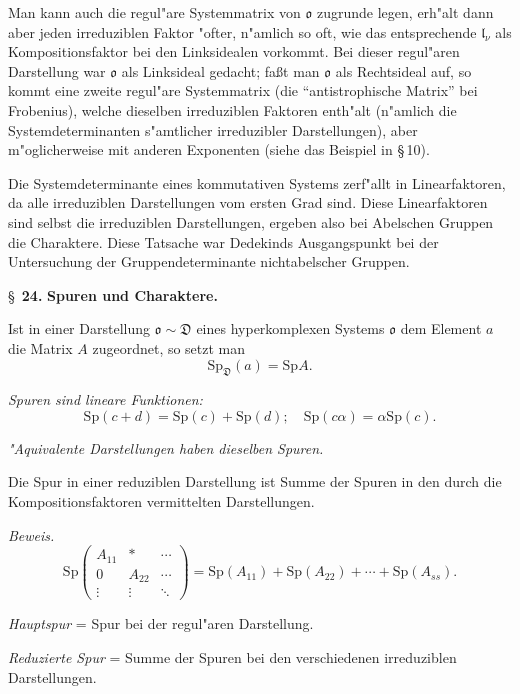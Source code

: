 \documentclass[12pt,a4paper]{article}
\theoremstyle{plain}
\newcommand{\Sp}{\mathrm{Sp}}
\begin{document}
Man kann auch die regul"are Systemmatrix von $\mathfrak{o}$ zugrunde legen, erh"alt dann aber jeden irreduziblen Faktor "ofter, n"amlich so oft, wie das entsprechende $\mathfrak{l}_\nu$ als Kompositionsfaktor bei den Linksidealen vorkommt. Bei dieser regul"aren Darstellung war $\mathfrak{o}$ als Linksideal gedacht; fa\ss t man $\mathfrak{o}$ als Rechtsideal auf, so kommt eine zweite regul"are Systemmatrix (die ``antistrophische Matrix'' bei Frobenius), welche dieselben irreduziblen Faktoren enth"alt (n"amlich die Systemdeterminanten s"amtlicher irreduzibler Darstellungen), aber m"oglicherweise mit anderen Exponenten (siehe das Beispiel in \S\,10).

Die Systemdeterminante eines kommutativen Systems zerf"allt in Linearfaktoren, da alle irreduziblen Darstellungen vom ersten Grad sind. Diese Linearfaktoren sind selbst die irreduziblen Darstellungen, ergeben also bei Abelschen Gruppen die Charaktere. Diese Tatsache war Dedekinds Ausgangspunkt bei der Untersuchung der Gruppendeterminante nichtabelscher Gruppen.

\newpage
\S~\textbf{24.}
\textbf{Spuren und Charaktere.}

\smallskip

\noindent
Ist in einer Darstellung $\mathfrak{o} \sim \mathfrak{D}$ eines hyperkomplexen Systems $\mathfrak{o}$ dem Element $a$ die Matrix $A$ zugeordnet, so setzt man
\[
\Sp_{\mathfrak{D}}(a) = \Sp A.
\]

\textit{Spuren sind lineare Funktionen:}
\[
\Sp(c+d) = \Sp(c) + \Sp(d);\quad \Sp(c\alpha) = \alpha\Sp(c).
\]

\textit{"Aquivalente Darstellungen haben dieselben Spuren.}

Die Spur in einer reduziblen Darstellung ist Summe der Spuren in den durch die Kompositionsfaktoren vermittelten Darstellungen.

\noindent\textit{Beweis.}
\[
\Sp\begin{pmatrix} A_{11} & * & \cdots \\ 0 & A_{22} & \cdots \\ \vdots & \vdots & \ddots \end{pmatrix}
= \Sp(A_{11}) + \Sp(A_{22}) + \cdots + \Sp(A_{ss}).
\]

\textit{Hauptspur} = Spur bei der regul"aren Darstellung.

\textit{Reduzierte Spur} = Summe der Spuren bei den verschiedenen irreduziblen Darstellungen.
\end{document}
